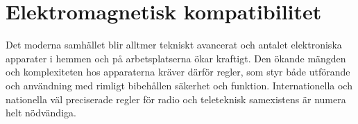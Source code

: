 \chapter{Elektromagnetisk kompatibilitet}
\label{ch:EMC}

Det moderna samhället blir alltmer tekniskt avancerat och antalet elektroniska
apparater i hemmen och på arbetsplatserna ökar kraftigt.
Den ökande mängden och komplexiteten hos apparaterna kräver därför regler, som
styr både utförande och användning med rimligt bibehållen säkerhet och funktion.
Internationella och nationella väl preciserade regler för radio och
teleteknisk samexistens är numera helt nödvändiga.
